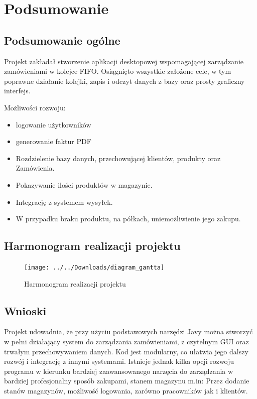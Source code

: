 \label{key}\chapter{Podsumowanie}
\label{cha:elementyPracyproj}
\section{Podsumowanie ogólne}
Projekt zakładał stworzenie aplikacji desktopowej wspomagającej zarządzanie zamówieniami w kolejce FIFO. Osiągnięto wszystkie założone cele, w tym poprawne działanie kolejki, zapis i odczyt danych z bazy oraz prosty graficzny interfejs.

Możliwości rozwoju:
\begin{itemize}
    \item logowanie użytkowników
    \item generowanie faktur PDF
    \item Rozdzielenie bazy danych, przechowującej klientów, produkty oraz Zamówienia.
    \item Pokazywanie ilości produktów w magazynie.
    \item Integrację z systemem wysyłek.
    \item W przypadku braku produktu, na półkach, uniemożliwienie jego zakupu.
\end{itemize}


\section{Harmonogram realizacji projektu}

\begin{figure}[H]
	\centering
	\texttt{[image: ../../Downloads/diagram\_gantta]}
	\caption{Harmonogram realizacji projektu}
	\label{fig:diagramgantta}
\end{figure}


\section{Wnioski}

Projekt udowadnia, że przy użyciu podstawowych narzędzi Javy można stworzyć w pełni działający
system do zarządzania zamówieniami, z czytelnym GUI oraz trwałym przechowywaniem danych. Kod jest
modularny, co ułatwia jego dalszy rozwój i integrację z innymi systemami. Istnieje jednak kilka opcji rozwoju programu w kierunku bardziej zaawansowanego narzęcia do zarządzania w bardziej profesjonalny sposób zakupami, stanem magazynu m.in: Przez dodanie stanów magazynów, możliwość logowania, zarówno pracowników jak i klientów.


